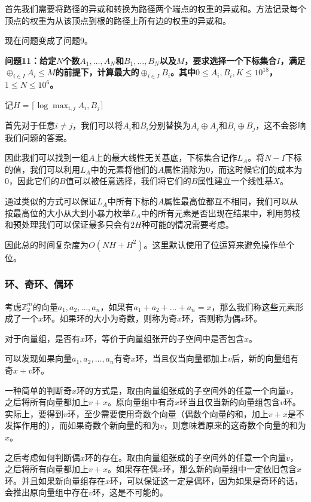 \documentclass[UTF8, twoside]{ctexart}
\begin{document}
\begin{sloppypar}
首先我们需要将路径的异或和转换为路径两个端点的权重的异或和。方法记录每个顶点的权重为从该顶点到根的路径上所有边的权重的异或和。

现在问题变成了问题9。

\textbf{问题11：给定$N$个数$A_1,\ldots,A_N$和$B_1,\ldots,B_N$以及$M$，要求选择一个下标集合$I$，满足$\oplus_{i\in I}A_i \leq M$的前提下，计算最大的$\oplus_{i\in I}B_i$。其中$0\leq A_i,B_i,K\leq 10^{18}$，$1\leq N\leq 10^6$。}

记$H=\lceil \log \max_{i,j} A_i,B_j \rceil$

首先对于任意$i\neq j$，我们可以将$A_i$和$B_i$分别替换为$A_i\oplus A_j$和$B_i\oplus B_j$，这不会影响我们问题的答案。

因此我们可以找到一组$A$上的最大线性无关基底，下标集合记作$L_A$。将$N-I$下标的值，我们可以利用$L_A$中的元素将他们的$A$属性消除为$0$，而这时候它们的成本为$0$，因此它们的$B$值可以被任意选择，我们将它们的$B$属性建立一个线性基$X$。

通过类似的方式可以保证$L_A$中所有下标的$A$属性最高位都互不相同，我们可以从按最高位的大小从大到小暴力枚举$L_A$中的所有元素是否出现在结果中，利用剪枝和预处理我们可以保证最多只会有$2H$种可能的情况需要考虑。

因此总的时间复杂度为$O(NH+H^2)$。这里默认使用了位运算来避免操作单个位。

\subsubsection{环、奇环、偶环}

考虑$\mathbb{Z}_2^m$的向量$a_1,a_2,\ldots,a_n$，如果有$a_1+a_2+\ldots+a_n=x$，那么我们称这些元素形成了一个$x$环。如果环的大小为奇数，则称为奇$x$环，否则称为偶$x$环。

对于向量组，是否有$x$环，等价于向量组张开的子空间中是否包含$x$。

可以发现如果向量$a_1,a_2,\ldots,a_n$有奇$x$环，当且仅当向量都加上$v$后，新的向量组有奇$x+v$环。

一种简单的判断奇$x$环的方式是，取由向量组张成的子空间外的任意一个向量$v$，之后将所有向量都加上$v+x$。原向量组中有奇$x$环当且仅当新的向量组包含$v$环。实际上，要得到$v$环，至少需要使用奇数个向量（偶数个向量的和，加上$v+x$是不发挥作用的），而如果奇数个新向量的和为$v$，则意味着原来的这奇数个向量的和为$x$。

之后考虑如何判断偶$x$环的存在。取由向量组张成的子空间外的任意一个向量$v$，之后将所有向量都加上$v+x$。如果存在偶$x$环，那么新的向量组中一定依旧包含$x$环。并且如果新向量组存在$x$环，可以保证这一定是偶环，因为如果是奇环的话，会推出原向量组中存在$v$环，这是不可能的。


\end{sloppypar}
\end{document}
